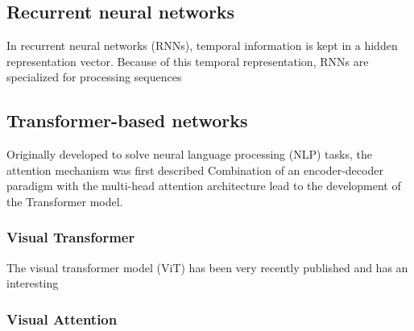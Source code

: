 \subsection{Recurrent neural networks}

In recurrent neural networks (RNNs), temporal information is kept in a hidden representation vector. Because of this temporal representation, RNNs are specialized for processing sequences

\subsection{Transformer-based networks}

Originally developed to solve neural language processing (NLP) tasks, the attention mechanism was first described \cite{vaswani_attention_2023}
Combination of an encoder-decoder paradigm with the multi-head attention architecture lead to the development of the Transformer model.


\subsubsection{Visual Transformer}

The visual transformer model (ViT) has been very recently published and has an interesting 

\subsubsection{Visual Attention}